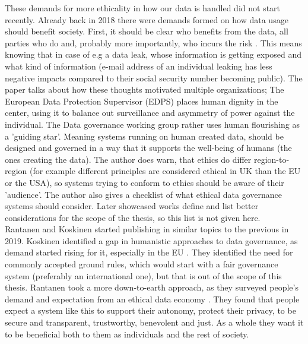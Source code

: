 \documentclass[a4paper,11pt]{report} %
\theoremstyle{change}
\theoremstyle{theoremstyle}
\begin{document}
These demands for more ethicality in how our data is handled did not start recently. Already back in 2018 there were demands formed on how data usage should benefit society. First, it should be clear who benefits from the data, all parties who do and, probably more importantly, who incurs the risk \cite{hand2018aspects}. This means knowing that in case of e.g a data leak, whose information is getting exposed and what kind of information (e-mail address of an individual leaking has less negative impacts compared to their social security number becoming public). The paper talks about how these thoughts motivated multiple organizations; The European Data Protection Supervisor (EDPS) places human dignity in the center, using it to balance out surveillance and asymmetry of power against the individual. The Data governance working group rather uses human flourishing as a 'guiding star'.  Meaning systems running on human created data, should be designed and governed in a way that it supports the well-being of humans (the ones creating the data). The author does warn, that ethics do differ region-to-region (for example different principles are considered ethical in UK than the EU  or the USA), so systems trying to conform to ethics should be aware of their 'audience'. The author also gives a checklist of what ethical data governance systems should consider. Later showcased works define and list better considerations for the scope of the thesis, so this list is not given here.\\
Rantanen and Koskinen started publishing in similar topics to the previous in 2019. Koskinen identified a gap in humanistic approaches to data governance, as demand started rising for it, especially in the EU \cite{koskinen2019if}. They identified the need for commonly accepted ground rules, which would start with a fair governance system (preferably an international one), but that is out of the scope of this thesis. Rantanen took a more down-to-earth approach, as they surveyed people's demand and expectation from an ethical data economy \cite{rantanen2019towards}. They found that people expect a system like this to support their autonomy, protect their privacy, to be secure and transparent, trustworthy, benevolent and just. As a whole they want it to be beneficial both to them as individuals and the rest of society.
\end{document}
